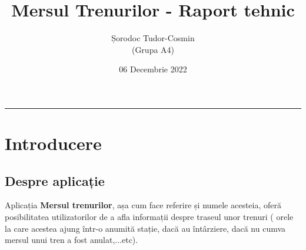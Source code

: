 \documentclass[runningheads]{llncs}
\begin{document}
%
\title{Mersul Trenurilor - Raport tehnic}
%
%
\author{Șorodoc Tudor-Cosmin \\ (Grupa A4)}
\date{06 Decembrie 2022}
%
\maketitle              %
%
\begin{center}
\end{center}
\par\noindent\rule{\textwidth}{0.4pt}
\section{Introducere}
\subsection{Despre aplicație}
Aplicația \textbf{Mersul trenurilor}, așa cum face referire și numele acesteia,
oferă posibilitatea utilizatorilor de a afla informații despre traseul unor trenuri
( orele la care acestea ajung într-o anumită stație, dacă au întârziere, dacă nu cumva mersul unui tren a fost anulat,...etc).
\end{document}
